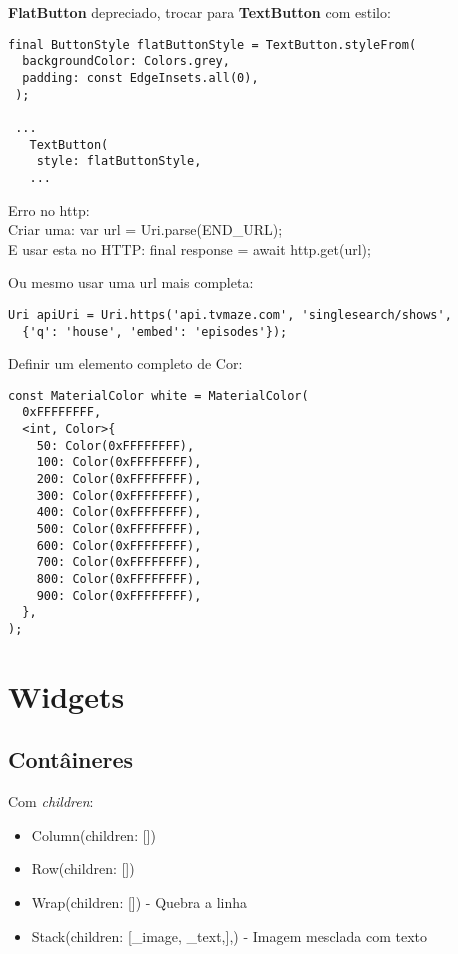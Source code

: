 \documentclass[11pt]{scrartcl}
\begin{document}
\textbf{FlatButton} depreciado, trocar para \textbf{TextButton} com estilo:
\begin{lstlisting}[]
 final ButtonStyle flatButtonStyle = TextButton.styleFrom(
  backgroundColor: Colors.grey,
  padding: const EdgeInsets.all(0),
 );

 ... 
   TextButton(
    style: flatButtonStyle,
   ...
\end{lstlisting}

Erro no http: \\
Criar uma: {\ttfamily var url = Uri.parse(END\_URL);} \\
E usar esta no HTTP: {\ttfamily final response = await http.get(url);}

Ou mesmo usar uma url mais completa:
\begin{lstlisting}[]
 Uri apiUri = Uri.https('api.tvmaze.com', 'singlesearch/shows',
  {'q': 'house', 'embed': 'episodes'});
\end{lstlisting}

Definir um elemento completo de Cor:
\begin{lstlisting}[]
const MaterialColor white = MaterialColor(
  0xFFFFFFFF,
  <int, Color>{
    50: Color(0xFFFFFFFF),
    100: Color(0xFFFFFFFF),
    200: Color(0xFFFFFFFF),
    300: Color(0xFFFFFFFF),
    400: Color(0xFFFFFFFF),
    500: Color(0xFFFFFFFF),
    600: Color(0xFFFFFFFF),
    700: Color(0xFFFFFFFF),
    800: Color(0xFFFFFFFF),
    900: Color(0xFFFFFFFF),
  },
);
\end{lstlisting}

\section{Widgets}

\subsection{Contâineres}
Com \textit{children}:
\begin{itemize}[nolistsep]
	\item {\ttfamily Column(children: [])}
	\item {\ttfamily Row(children: [])}
	\item {\ttfamily Wrap(children: [])} - Quebra a linha
	\item {\ttfamily Stack(children: [\_image, \_text,],)} - Imagem mesclada com texto
\end{itemize}
\end{document}
